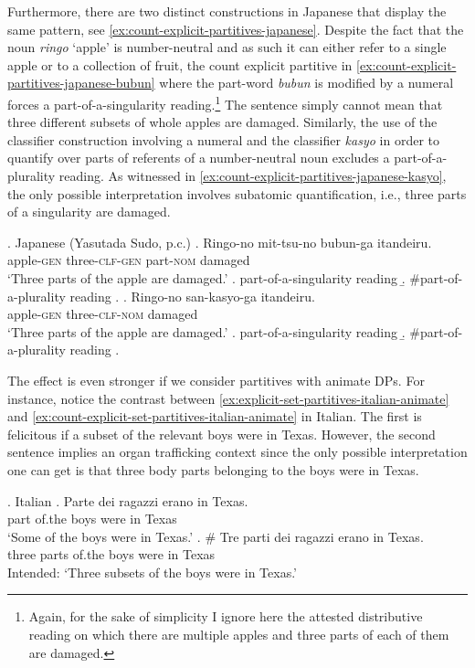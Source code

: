 Furthermore, there are two distinct constructions in Japanese that display the same pattern, see \ref{ex:count-explicit-partitives-japanese}. Despite the fact that the noun \textit{ringo} `apple' is number-neutral and as such it can either refer to a single apple or to a collection of fruit, the count explicit partitive in \ref{ex:count-explicit-partitives-japanese-bubun} where the part-word \textit{bubun} is modified by a numeral forces a part-of-a-singularity reading.\footnote{Again, for the sake of simplicity I ignore here the attested distributive reading on which there are multiple apples and three parts of each of them are damaged.} The sentence simply cannot mean that three different subsets of whole apples are damaged. Similarly, the use of the classifier construction involving a numeral and the classifier \textit{kasyo} in order to quantify over parts of referents of a number-neutral noun excludes a part-of-a-plurality reading. As witnessed in \ref{ex:count-explicit-partitives-japanese-kasyo}, the only possible interpretation involves subatomic quantification, i.e., three parts of a singularity are damaged. 

\ex. Japanese (Yasutada Sudo, p.c.)\label{ex:count-explicit-partitives-japanese}
\ag. Ringo-no mit-tsu-no bubun-ga itandeiru.\\
apple-\textsc{gen} three-\textsc{clf}-\textsc{gen} part-\textsc{nom} damaged\\
`Three parts of the apple are damaged.'\label{ex:count-explicit-partitives-japanese-bubun}
\a. part-of-a-singularity reading
\b. \#part-of-a-plurality reading
\z. 
\bg. Ringo-no san-kasyo-ga itandeiru.\\
apple-\textsc{gen} three-\textsc{clf}-\textsc{nom} damaged\\
`Three parts of the apple are damaged.'\label{ex:count-explicit-partitives-japanese-kasyo}
\a. part-of-a-singularity reading
\b. \#part-of-a-plurality reading
\z.

The effect is even stronger if we consider partitives with animate DPs. For instance, notice the contrast between \ref{ex:explicit-set-partitives-italian-animate} and \ref{ex:count-explicit-set-partitives-italian-animate} in Italian. The first is felicitous if a subset of the relevant boys were in Texas. However, the second sentence implies an organ trafficking context since the only possible interpretation one can get is that three body parts belonging to the boys were in Texas. 

    \ex.\label{ex:count-explicit-partitives-italian-animate} Italian \citep[p. 186; adapted]{schwarzschild1996pluralities}
    \ag. Parte dei ragazzi erano in Texas.\label{ex:explicit-set-partitives-italian-animate}\\
	part of.the boys were in Texas\\
	`Some of the boys were in Texas.'	
    \bg. \# Tre parti dei ragazzi erano in Texas.\label{ex:count-explicit-set-partitives-italian-animate}\\
	three parts of.the boys were in Texas\\
	Intended: `Three subsets of the boys were in Texas.'

